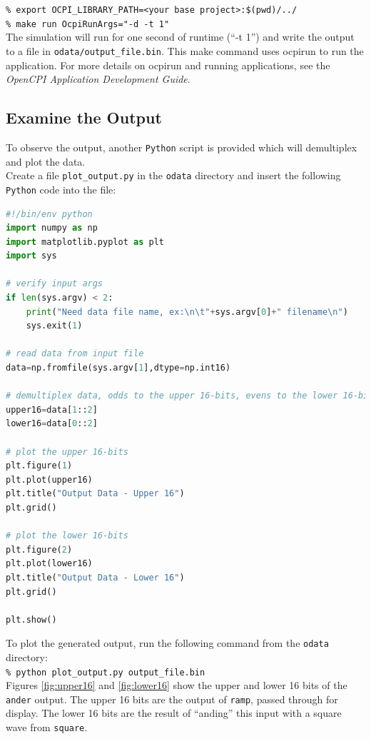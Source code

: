 \forceindent\verb+% export OCPI_LIBRARY_PATH=<your base project>:$(pwd)/../+\\
\forceindent\verb+% make run OcpiRunArgs="-d -t 1"+\\
\bend
The simulation will run for one second of runtime (``-t 1'') and write the output to a file in \verb+odata/output_file.bin+.
This make command uses ocpirun to run the application. For more details on ocpirun and running applications, see the \textit{OpenCPI Application Development Guide}.

\subsection{Examine the Output}
To observe the output, another \verb+Python+ script is provided which will demultiplex and plot the data.\\
\bstart
Create a file \verb+plot_output.py+ in the \verb+odata+ directory and insert the following \verb+Python+ code into the file:
\begin{lstlisting}[language=python]
#!/bin/env python
import numpy as np
import matplotlib.pyplot as plt
import sys

# verify input args
if len(sys.argv) < 2:
    print("Need data file name, ex:\n\t"+sys.argv[0]+" filename\n")
    sys.exit(1)

# read data from input file
data=np.fromfile(sys.argv[1],dtype=np.int16)

# demultiplex data, odds to the upper 16-bits, evens to the lower 16-bits
upper16=data[1::2]
lower16=data[0::2]

# plot the upper 16-bits
plt.figure(1)
plt.plot(upper16)
plt.title("Output Data - Upper 16")
plt.grid()

# plot the lower 16-bits
plt.figure(2)
plt.plot(lower16)
plt.title("Output Data - Lower 16")
plt.grid()

plt.show()
\end{lstlisting}
\bend
\bstart
To plot the generated output, run the following command from the \verb+odata+ directory:\\

\forceindent\verb+% python plot_output.py output_file.bin+\\
\bend
Figures \ref{fig:upper16} and \ref{fig:lower16} show the upper and lower 16 bits of the \verb+ander+ output. The upper 16 bits are the output of \verb+ramp+, passed through for display. The lower 16 bits are the result of ``anding'' this input with a square wave from \verb+square+.\\

